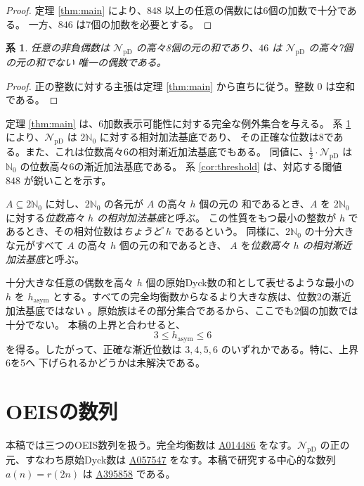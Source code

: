 \documentclass[12pt]{ltjsarticle}
\theoremstyle{plain}
\newtheorem{corollary}[theorem]{系}
\newcommand{\NpD}{\mathcal{N}_{\mathrm{pD}}}
\newcommand{\seqnum}[1]{\href{https://oeis.org/#1}{\rm \underline{#1}}}
\begin{document}
\begin{proof}
定理 \ref{thm:main} により、$848$ 以上の任意の偶数には6個の加数で十分である。
一方、$846$ は7個の加数を必要とする。
\end{proof}

\begin{corollary}\label{cor:eight}
任意の非負偶数は $\NpD$ の高々8個の元の和であり、$46$ は $\NpD$ の高々7個の元の和でない
唯一の偶数である。
\end{corollary}

\begin{proof}
正の整数に対する主張は定理 \ref{thm:main} から直ちに従う。整数 $0$ は空和である。
\end{proof}

定理 \ref{thm:main} は、6加数表示可能性に対する完全な例外集合を与える。
系 \ref{cor:eight} により、$\NpD$ は $2\mathbb N_0$ に対する相対加法基底であり、
その正確な位数は8である。また、これは位数高々6の相対漸近加法基底でもある。
同値に、$\frac12\cdot\NpD$ は $\mathbb N_0$ の位数高々6の漸近加法基底である。
系 \ref{cor:threshold} は、対応する閾値 $848$ が鋭いことを示す。

$A\subseteq2\mathbb N_0$ に対し、$2\mathbb N_0$ の各元が $A$ の高々 $h$ 個の元の
和であるとき、$A$ を $2\mathbb N_0$ に対する\emph{位数高々 $h$ の相対加法基底}と呼ぶ。
この性質をもつ最小の整数が $h$ であるとき、その相対位数は\emph{ちょうど $h$} であるという。
同様に、$2\mathbb N_0$ の十分大きな元がすべて $A$ の高々 $h$ 個の元の和であるとき、
$A$ を\emph{位数高々 $h$ の相対漸近加法基底}と呼ぶ。

十分大きな任意の偶数を高々 $h$ 個の原始Dyck数の和として表せるような最小の $h$ を
$h_{\mathrm{asym}}$ とする。すべての完全均衡数からなるより大きな族は、位数2の漸近加法基底ではない
\cite[Thm.~14]{BLS}。原始族はその部分集合であるから、ここでも2個の加数では十分でない。
本稿の上界と合わせると、
\[
        3\leq h_{\mathrm{asym}}\leq6
\]
を得る。したがって、正確な漸近位数は $3,4,5,6$ のいずれかである。特に、上界6を5へ
下げられるかどうかは未解決である。

\section{OEISの数列}\label{sec:oeis}

本稿では三つのOEIS数列を扱う。完全均衡数は \seqnum{A014486}
\cite{OEIS-A014486} をなす。$\NpD$ の正の元、すなわち原始Dyck数は
\seqnum{A057547} \cite{OEIS-A057547} をなす。本稿で研究する中心的な数列
$a(n)=r(2n)$ は \seqnum{A395858} \cite{OEIS-A395858} である。
\end{document}
